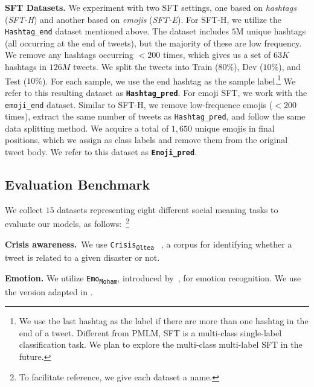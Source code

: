 \noindent\textbf{SFT Datasets.}\label{subsec:sft:data}
We experiment with two SFT settings, one based on \textit{hashtags} (\textit{SFT-H}) and another based on \textit{emojis} (\textit{SFT-E}). For SFT-H, we utilize the \texttt{Hashtag\_end} dataset mentioned above. The dataset includes $5$M unique hashtags (all occurring at the end of tweets), but the majority of these are low frequency. We remove any hashtags occurring $< 200$ times, which gives us a set of $63K$ hashtags in $126M$ tweets. We split the tweets into Train ($80\%$), Dev ($10\%$), and Test ($10\%$). For each sample, we use the end hashtag as the sample label.\footnote{We use the last hashtag as the label if there are more than one hashtag in the end of a tweet. Different from PMLM, SFT is a multi-class single-label classification task. We plan to explore the multi-class multi-label SFT in the future.} We refer to this resulting dataset as \textbf{\texttt{Hashtag\_pred}}. For emoji SFT, we work with the \texttt{emoji\_end} dataset. Similar to SFT-H, we remove low-frequence emojis ($< 200$ times), extract the same number of tweets as \texttt{Hashtag\_pred}, and follow the same data splitting method. We acquire a total of $1,650$ unique emojis in final positions, which we assign as class labels and remove them from the original tweet body. We refer to this dataset as \textbf{\texttt{Emoji\_pred}}.

\subsection{Evaluation Benchmark}\label{sec:smpb} 
We collect $15$ datasets representing eight different social meaning tasks to evaluate our models, as follows:~\footnote{To facilitate reference, we give each dataset a name.}
 

\noindent\textbf{Crisis awareness.}~We use \texttt{Crisis\textsubscript{Oltea}} ~\cite{olteanu2014crisislex}, a corpus for identifying whether a tweet is related to a given disaster or not. %
    
 \noindent     \textbf{Emotion.} We utilize \texttt{Emo\textsubscript{Moham}}, introduced by~\citet{mohammad-2018-semeval}, for emotion recognition. We use the version adapted in \citet{barbieri-2020-tweeteval}.
 
